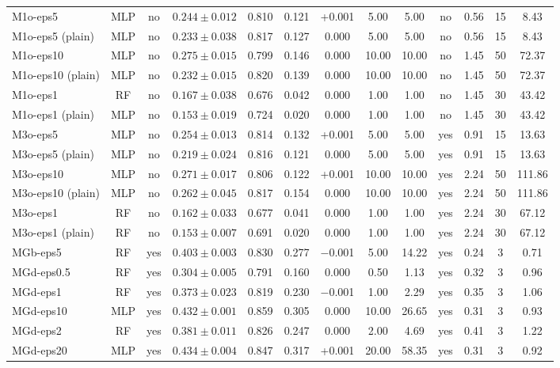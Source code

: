 \begin{landscape}
\begin{longtable}{lccccccccccc c}
M1o-eps5 & MLP & no & $0.244 \pm 0.012$ & 0.810 & 0.121 & +0.001 & 5.00 & 5.00 & no & 0.56 & 15 & 8.43 \\
M1o-eps5 (plain) & MLP & no & $0.233 \pm 0.038$ & 0.817 & 0.127 & 0.000 & 5.00 & 5.00 & no & 0.56 & 15 & 8.43 \\
M1o-eps10 & MLP & no & $0.275 \pm 0.015$ & 0.799 & 0.146 & 0.000 & 10.00 & 10.00 & no & 1.45 & 50 & 72.37 \\
M1o-eps10 (plain) & MLP & no & $0.232 \pm 0.015$ & 0.820 & 0.139 & 0.000 & 10.00 & 10.00 & no & 1.45 & 50 & 72.37 \\
M1o-eps1 & RF & no & $0.167 \pm 0.038$ & 0.676 & 0.042 & 0.000 & 1.00 & 1.00 & no & 1.45 & 30 & 43.42 \\
M1o-eps1 (plain) & MLP & no & $0.153 \pm 0.019$ & 0.724 & 0.020 & 0.000 & 1.00 & 1.00 & no & 1.45 & 30 & 43.42 \\
M3o-eps5 & MLP & no & $0.254 \pm 0.013$ & 0.814 & 0.132 & +0.001 & 5.00 & 5.00 & yes & 0.91 & 15 & 13.63 \\
M3o-eps5 (plain) & MLP & no & $0.219 \pm 0.024$ & 0.816 & 0.121 & 0.000 & 5.00 & 5.00 & yes & 0.91 & 15 & 13.63 \\
M3o-eps10 & MLP & no & $0.271 \pm 0.017$ & 0.806 & 0.122 & +0.001 & 10.00 & 10.00 & yes & 2.24 & 50 & 111.86 \\
M3o-eps10 (plain) & MLP & no & $0.262 \pm 0.045$ & 0.817 & 0.154 & 0.000 & 10.00 & 10.00 & yes & 2.24 & 50 & 111.86 \\
M3o-eps1 & RF & no & $0.162 \pm 0.033$ & 0.677 & 0.041 & 0.000 & 1.00 & 1.00 & yes & 2.24 & 30 & 67.12 \\
M3o-eps1 (plain) & RF & no & $0.153 \pm 0.007$ & 0.691 & 0.020 & 0.000 & 1.00 & 1.00 & yes & 2.24 & 30 & 67.12 \\
MGb-eps5 & RF & yes & $0.403 \pm 0.003$ & 0.830 & 0.277 & $-$0.001 & 5.00 & 14.22 & yes & 0.24 & 3 & 0.71 \\
MGd-eps0.5 & RF & yes & $0.304 \pm 0.005$ & 0.791 & 0.160 & 0.000 & 0.50 & 1.13 & yes & 0.32 & 3 & 0.96 \\
MGd-eps1 & RF & yes & $0.373 \pm 0.023$ & 0.819 & 0.230 & $-$0.001 & 1.00 & 2.29 & yes & 0.35 & 3 & 1.06 \\
MGd-eps10 & MLP & yes & $0.432 \pm 0.001$ & 0.859 & 0.305 & 0.000 & 10.00 & 26.65 & yes & 0.31 & 3 & 0.93 \\
MGd-eps2 & RF & yes & $0.381 \pm 0.011$ & 0.826 & 0.247 & 0.000 & 2.00 & 4.69 & yes & 0.41 & 3 & 1.22 \\
MGd-eps20 & MLP & yes & $0.434 \pm 0.004$ & 0.847 & 0.317 & +0.001 & 20.00 & 58.35 & yes & 0.31 & 3 & 0.92 \\

\end{longtable}
\end{landscape}
